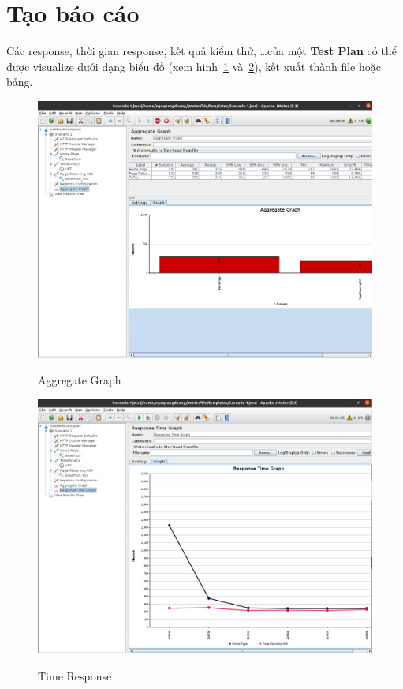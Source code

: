 \documentclass[12pt]{report}
\begin{document}
\section{Tạo báo cáo}

\par Các response, thời gian response, kết quả kiểm thử, \ldots của một \textbf{Test Plan} có thể được visualize dưới dạng biểu đồ (xem hình~\ref{fig:aggregate} và~\ref{fig:time-response}), kết xuất thành file hoặc bảng.

\begin{figure}[htp]
    \centering
    \includegraphics[scale=0.3]{jmeter-images/aggregate.png}
    \caption{Aggregate Graph}
    {\label{fig:aggregate}}
\end{figure}

\begin{figure}[htp]
    \centering
    \includegraphics[scale=0.3]{jmeter-images/timeresponse.png}
    \caption{Time Response}
    {\label{fig:time-response}}
\end{figure}
\end{document}
